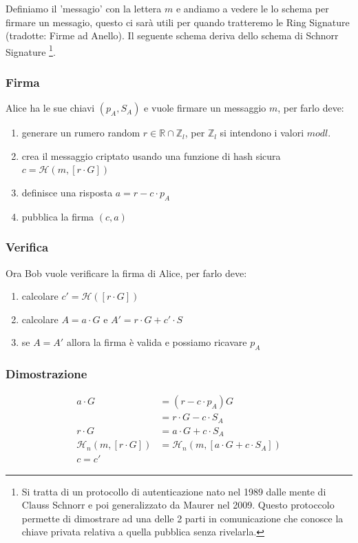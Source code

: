 \documentclass[12pt,a4paper]{article}
\begin{document}
Definiamo il 'messagio' con la lettera $ m $ e andiamo a vedere le lo schema per
firmare un messagio, questo ci sarà utili per quando tratteremo le Ring
Signature (tradotte: Firme ad Anello). Il seguente schema deriva dello schema di
Schnorr Signature \footnote{Si tratta di un protocollo di autenticazione nato nel 1989 dalle mente 
di Clauss Schnorr e poi generalizzato da Maurer nel 2009.
Questo protoccolo permette di dimostrare ad una delle 2 parti in comunicazione 
che conosce la chiave privata relativa a quella pubblica senza rivelarla.}.

\subsubsection*{Firma}
Alice ha le sue chiavi $ (p_A, S_A) $ e vuole firmare un messaggio $ m $, per farlo 
deve:
\begin{enumerate}
    \item generare un rumero random $ r \in \mathbb{R} \cap \mathbb{Z}_l
    $, per $ \mathbb{Z}_l $ si intendono i valori $ mod l $.
    \item crea il messaggio criptato usando una funzione di hash sicura $ c =
    \mathcal{H}(m, [r \cdot G]) $
    \item definisce una risposta $ a = r - c \cdot p_A $
    \item pubblica la firma $ (c, a) $
\end{enumerate}

\subsubsection*{Verifica}

Ora Bob vuole verificare la firma di Alice, per farlo deve:

\begin{enumerate}
    \item calcolare $ c' = \mathcal{H}([r \cdot G]) $
    \item calcolare $ A = a \cdot G $ e $ A' = r \cdot G + c' \cdot S $
    \item se $ A = A' $ allora la firma è valida e possiamo ricavare $ p_A $
\end{enumerate}

\subsubsection*{Dimostrazione}

\begin{align*}
    a\cdot G &= (r - c \cdot p_A) G \\
    &= r\cdot G - c \cdot S_A\\
    r\cdot G &= a\cdot G + c\cdot S_A\\
    \mathcal{H}_n(m, [r\cdot G]) &= \mathcal{H}_n(m, [a\cdot G + c\cdot S_A])\\
    c = c'   
\end{align*}
\end{document}
